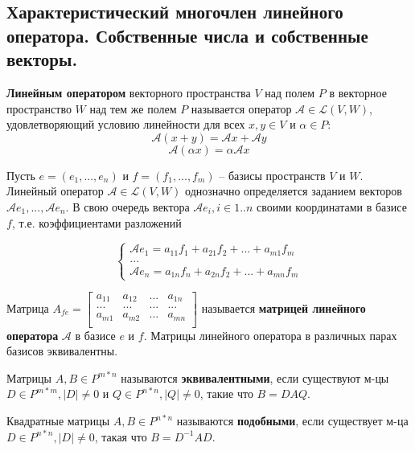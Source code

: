 \subsection{Характеристический многочлен линейного оператора. Собственные числа и собственные векторы.}

\textbf{Линейным оператором} векторного пространства $V$ над полем $P$ в векторное пространство $W$ над тем же полем $P$ называется оператор $\mathcal{A} \in \mathcal{L}(V, W)$, удовлетворяющий условию линейности для всех $x, y \in V$ и $\alpha \in P$:
$$\mathcal{A} (x+y) = \mathcal{A} x + \mathcal{A} y$$
$$\mathcal{A} (\alpha x) = \alpha \mathcal{A} x$$

Пусть $e = (e_1, ..., e_n)$ и $f = (f_1, ..., f_m)$ -- базисы пространств $V$ и $W$. Линейный оператор $\mathcal{A} \in \mathcal{L}(V, W)$ однозначно определяется заданием векторов $\mathcal{A} e_1, ..., \mathcal{A} e_n$. В свою очередь вектора $\mathcal{A} e_i, i \in 1..n$ своими координатами в базисе $f$, т.е. коэффициентами разложений

$$\begin{cases} 
 \mathcal{A} e_1 = a_{11} f_1 + a_{21} f_2 + ... + a_{m1} f_m \\
 ... \\
 \mathcal{A} e_n = a_{1n} f_n + a_{2n} f_2 + ... + a_{mn} f_m
\end{cases}$$

Матрица $A_{fe} = 
\begin{bmatrix}
a_{11} & a_{12} & ... & a_{1n} \\
... & ... & ... & ... \\
a_{m1} & a_{m2} & ... & a_{mn} \\
\end{bmatrix}$
называется \textbf{матрицей линейного оператора} $\mathcal{A}$ в базисе $e$ и $f$. Матрицы линейного оператора в различных парах базисов эквивалентны.

Матрицы $A, B \in P^{m*n}$ называются \textbf{эквивалентными}, если существуют м-цы $D \in P^{m*m}, |D| \neq 0$ и $Q \in P^{n*n}, |Q| \neq 0$, такие что $B = D A Q$.

Квадратные матрицы $A, B \in P^{n*n}$ называются \textbf{подобными}, если существует м-ца $D \in P^{n*n}, |D| \neq 0$, такая что $B = D^{-1} A D$.


